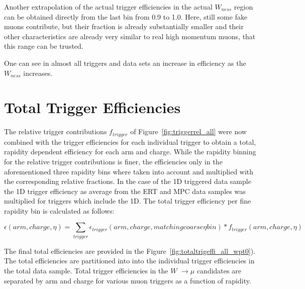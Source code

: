 Another extrapolation of the actual trigger efficiencies in the actual
$W_{ness}$ region can be obtained directly from the last bin from 0.9 to 1.0.
Here, still some fake muons contribute, but their fraction is already
substantially smaller and their other characteristics are already very similar
to real high momentum muons, that this range can be trusted.  

One can see in almost all triggers and data sets an increase in efficiency as
the $W_{ness}$ increases. 

\clearpage
\section{Total Trigger Efficiencies }
The relative trigger contributions $f_{trigger}$ of
Figure~\ref{fig:triggerrel_all} were now combined with the trigger efficiencies
for each individual trigger to obtain a total, rapidity dependent efficiency for
each arm and charge. While the rapidity binning for the relative trigger
contributions is finer, the efficiencies only in the aforementioned three
rapidity bins where taken into account and multiplied with the corresponding
relative fractions. In the case of the 1D triggered data sample the 1D trigger
efficiency as average from the ERT and MPC data samples was multiplied for
triggers which include the 1D. The total trigger efficiency per fine rapidity
bin is calculated as follows:

\begin{equation}
\epsilon (arm,charge,\eta) = \sum_{trigger}
\epsilon_{trigger}(arm,charge,matching coarse \eta bin) *
f_{trigger}(arm,charge,\eta)
\end{equation}

The final total efficiencies are provided in the
Figure~\ref{fig:totaltrigeffi_all_wpt0}). The total efficiencies are partitioned
into into the individual trigger efficiencies in the total data sample.  Total
trigger efficiencies in the $W$ $\rightarrow \mu$ candidates are separated by arm
and charge for various muon triggers as a function of rapidity. 

